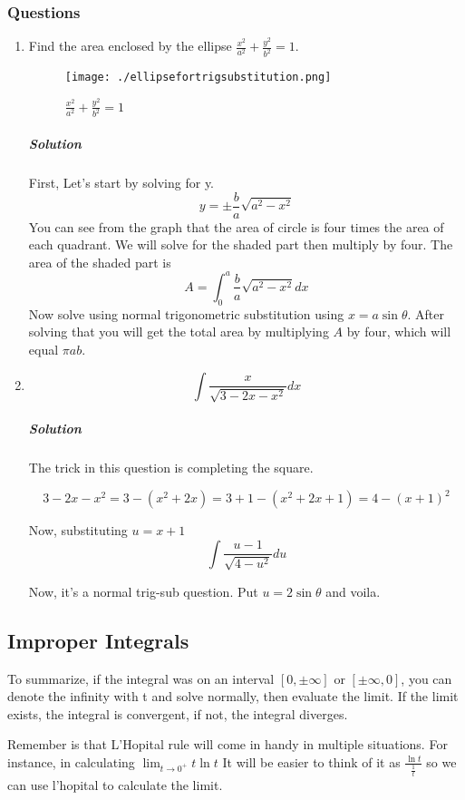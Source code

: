 \documentclass{article}
\begin{document}
	\subsubsection{Questions}
	\begin{enumerate}[1.]
		\item Find the area enclosed by the ellipse $ \frac{x^2}{a^2} + \frac{y^2}{b^2} = 1 $.

			\begin{figure}[h]
				\centering
				\texttt{[image: ./ellipsefortrigsubstitution.png]}
				\caption{ $ \frac{x^2}{a^2} + \frac{y^2}{b^2} = 1 $}
				\label{fig:-ellipsefortrigsubstitution-png}
			\end{figure}

			\subparagraph{Solution}
			First, Let's start by solving for y.
			\[
				y = \pm \frac{b}{a} \sqrt{ a^2 - x^2 }
			\]
			You can see from the graph that the area of circle is four times the area of each quadrant. We will solve for the shaded part then multiply by four. The area of the shaded part is
			\[
				A = \int^{a}_{0} \frac{b}{a} \sqrt{ a^2-x^2 } dx  
			\]
			Now solve using normal trigonometric substitution using $ x = a \sin{ \theta }  $. After solving that you will get the total area by multiplying $ A $ by four, which will equal $ \pi a b $.

		\item \[
				\int \frac{x}{ \sqrt{ 3-2x-x^2 } } dx
			\]

			\subparagraph{Solution}
			The trick in this question is completing the square.

			\[
				3-2x-x^2 = 3 - (x^2+2x)	= 3 + 1 - (x^2+2x+1) = 4 - (x+1)^2 
			\]

			Now, substituting $ u = x+1 $ 
			\[
				\int \frac{ u-1 }{ \sqrt{ 4 - u^2 } }  du
			\]

			Now, it's a normal trig-sub question. Put $ u = 2 \sin{ \theta }  $ and voila.

	\end{enumerate}
	\newpage
	\subsection{Improper Integrals}
	To summarize, if the integral was on an interval $ [0,\pm \infty] $ or $ [\pm \infty,0] $, you can denote the infinity with t and solve normally, then evaluate the limit. If the limit exists, the integral is convergent, if not, the integral diverges.

	Remember is that L'Hopital rule  will come in handy in multiple situations. For instance, in calculating $ \lim_{t \to 0^+} t \ln t $ It will be easier to think of it as $ \frac{\ln t}{\frac{1}{t}} $ so we can use l'hopital to calculate the limit. 
\end{document}
